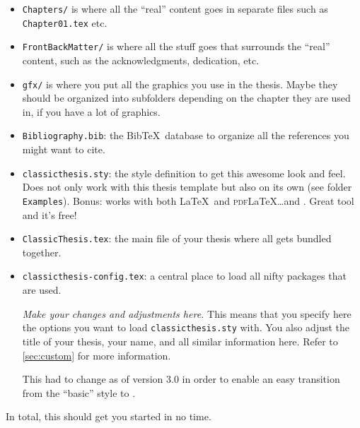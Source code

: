 \begin{itemize}
    \item\texttt{Chapters/} is where all the ``real'' content goes in
    separate files such as \texttt{Chapter01.tex} etc.
    \item\texttt{FrontBackMatter/} is where all the stuff goes that
    surrounds the ``real'' content, such as the acknowledgments,
    dedication, etc.
    \item\texttt{gfx/} is where you put all the graphics you use in
    the thesis. Maybe they should be organized into subfolders
    depending on the chapter they are used in, if you have a lot of
    graphics.
    \item\texttt{Bibliography.bib}: the Bib\TeX\ database to organize
    all the references you might want to cite.
    \item\texttt{classicthesis.sty}: the style definition to get this
    awesome look and feel. Does not only work with this thesis template
    but also on its own (see folder \texttt{Examples}). Bonus: works
    with both \LaTeX\ and \textsc{pdf}\LaTeX\dots and \mLyX.
    Great tool and it's free!
    \item\texttt{ClassicThesis.tex}: the main file of your thesis
    where all gets bundled together.
    \item\texttt{classicthesis-config.tex}: a central place to load all
    nifty packages that are used. %

    \emph{Make your changes and adjustments here.} This means that you
    specify here the options you want to load \texttt{classicthesis.sty}
    with. You also adjust the title of your thesis, your name, and all
    similar information here. Refer to \autoref{sec:custom} for more
    information.

    This had to change as of version 3.0 in order to enable an easy
    transition from the ``basic'' style to \mLyX.
\end{itemize}
In total, this should get you started in no time.


